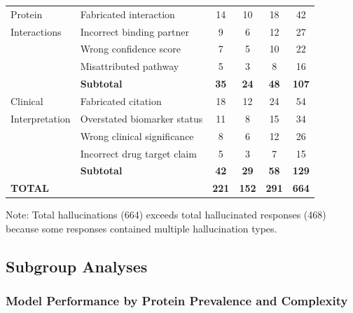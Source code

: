 \documentclass[11pt,a4paper]{article}
\begin{document}
\begin{longtable}{llcccc}
Protein & Fabricated interaction & 14 & 10 & 18 & 42 \\
Interactions & Incorrect binding partner & 9 & 6 & 12 & 27 \\
& Wrong confidence score & 7 & 5 & 10 & 22 \\
& Misattributed pathway & 5 & 3 & 8 & 16 \\
& \textbf{Subtotal} & \textbf{35} & \textbf{24} & \textbf{48} & \textbf{107} \\
\midrule

Clinical & Fabricated citation & 18 & 12 & 24 & 54 \\
Interpretation & Overstated biomarker status & 11 & 8 & 15 & 34 \\
& Wrong clinical significance & 8 & 6 & 12 & 26 \\
& Incorrect drug target claim & 5 & 3 & 7 & 15 \\
& \textbf{Subtotal} & \textbf{42} & \textbf{29} & \textbf{58} & \textbf{129} \\
\midrule

\multicolumn{2}{l}{\textbf{TOTAL}} & \textbf{221} & \textbf{152} & \textbf{291} & \textbf{664} \\
\end{longtable}

Note: Total hallucinations (664) exceeds total hallucinated responses (468) because some responses contained multiple hallucination types.

\subsection{Subgroup Analyses}

\subsubsection{Model Performance by Protein Prevalence and Complexity}
\end{document}
